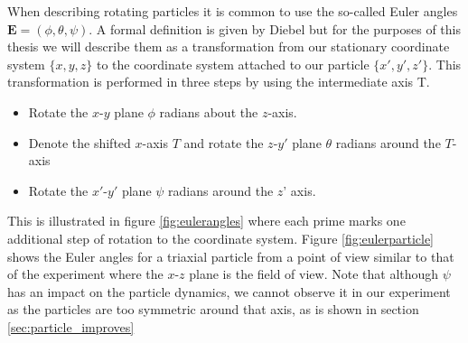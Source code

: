 When describing rotating particles it is common to use the so-called Euler angles $\mathbf{E} = (\phi, \theta, \psi)$. A formal definition is given by Diebel \cite{Euler} but for the purposes of this thesis we will describe them as a transformation from our stationary coordinate system $\{x,y,z\}$ to the coordinate system attached to our particle $\{x',y',z'\}$. This transformation is performed in three steps by using the intermediate axis T.

\begin{itemize}
\item Rotate the $x$-$y$ plane $\phi$ radians about the $z$-axis.
\item Denote the shifted $x$-axis $T$ and rotate the $z$-$y'$ plane $\theta$ radians around the $T$-axis
\item Rotate the $x'$-$y'$ plane $\psi$ radians around the $z$' axis.
\end{itemize}

This is illustrated in figure \ref{fig:eulerangles} where each prime marks one additional step of rotation to the coordinate system. Figure \ref{fig:eulerparticle} shows the Euler angles for a triaxial particle from a point of view similar to that of the experiment where the $x$-$z$ plane is the field of view. Note that although $\psi$ has an impact on the particle dynamics, we cannot observe it in our experiment as the particles are too symmetric around that axis, as is shown in section \ref{sec:particle_improves}


